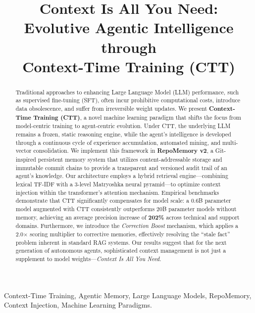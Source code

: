 \documentclass[conference]{IEEEtran}
\begin{document}
\title{Context Is All You Need:\\Evolutive Agentic Intelligence through\\Context-Time Training (CTT)}
\author{
}
\maketitle
\begin{abstract}
Traditional approaches to enhancing Large Language Model (LLM) performance, such as supervised fine-tuning (SFT), often incur prohibitive computational costs, introduce data obsolescence, and suffer from irreversible weight updates. We present \textbf{Context-Time Training (CTT)}, a novel machine learning paradigm that shifts the focus from model-centric training to agent-centric evolution. Under CTT, the underlying LLM remains a frozen, static reasoning engine, while the agent's intelligence is developed through a continuous cycle of experience accumulation, automated mining, and multi-vector consolidation.
We implement this framework in \textbf{RepoMemory v2}, a Git-inspired persistent memory system that utilizes content-addressable storage and immutable commit chains to provide a transparent and versioned audit trail of an agent's knowledge. Our architecture employs a hybrid retrieval engine---combining lexical TF-IDF with a 3-level Matryoshka neural pyramid---to optimize context injection within the transformer's attention mechanism.
Empirical benchmarks demonstrate that CTT significantly compensates for model scale: a 0.6B parameter model augmented with CTT consistently outperforms 20B parameter models without memory, achieving an average precision increase of \textbf{202\%} across technical and support domains. Furthermore, we introduce the \emph{Correction Boost} mechanism, which applies a 2.0$\times$ scoring multiplier to corrective memories, effectively resolving the ``stale fact'' problem inherent in standard RAG systems. Our results suggest that for the next generation of autonomous agents, sophisticated context management is not just a supplement to model weights---\emph{Context Is All You Need}.
\end{abstract}
\begin{IEEEkeywords}
Context-Time Training, Agentic Memory, Large Language Models, RepoMemory, Context Injection, Machine Learning Paradigms.
\end{IEEEkeywords}
\end{document}
